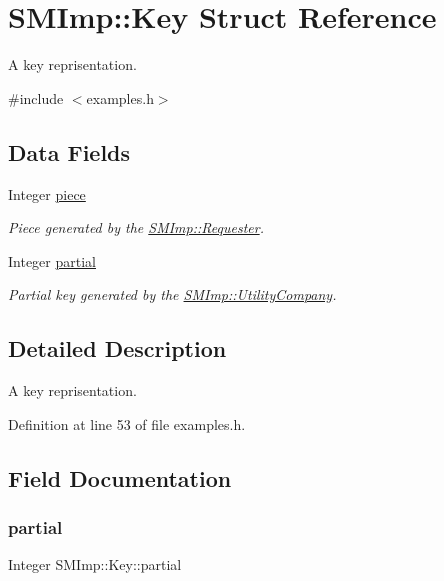 \hypertarget{structSMImp_1_1Key}{}\section{S\+M\+Imp\+:\+:Key Struct Reference}
\label{structSMImp_1_1Key}


A key reprisentation.  




{\ttfamily \#include $<$examples.\+h$>$}

\subsection*{Data Fields}
\begin{DoxyCompactItemize}
\item 
Integer \hyperlink{structSMImp_1_1Key_a10781e222703128151623806fdaa0b66}{piece}
\begin{DoxyCompactList}\small\item\em Piece generated by the \hyperlink{classSMImp_1_1Requester}{S\+M\+Imp\+::\+Requester}. \end{DoxyCompactList}\item 
Integer \hyperlink{structSMImp_1_1Key_aca464fb15bb8ec1bcd3c5fe51833f587}{partial}
\begin{DoxyCompactList}\small\item\em Partial key generated by the \hyperlink{classSMImp_1_1UtilityCompany}{S\+M\+Imp\+::\+Utility\+Company}. \end{DoxyCompactList}\end{DoxyCompactItemize}


\subsection{Detailed Description}
A key reprisentation. 

Definition at line 53 of file examples.\+h.



\subsection{Field Documentation}
\mbox{\label{structSMImp_1_1Key_aca464fb15bb8ec1bcd3c5fe51833f587}} 
\subsubsection{\texorpdfstring{partial}{partial}}
{\footnotesize\ttfamily Integer S\+M\+Imp\+::\+Key\+::partial}



